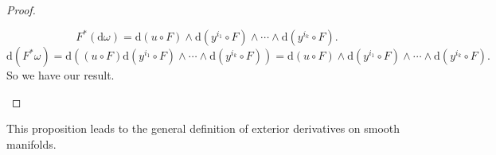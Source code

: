 \documentclass[../main.tex]{subfiles}
\begin{document}
\begin{proof}
\begin{itemize}
      \begin{equation*}
        F^*(\mathrm{d} \omega) = \mathrm{d} (u \circ F) \wedge \mathrm{d} (y^{i_1} \circ F) \wedge \cdots \wedge \mathrm{d} (y^{i_k} \circ F).
      \end{equation*}
      \begin{equation*}
        \mathrm{d} (F^* \omega) = \mathrm{d} ((u \circ F) \mathrm{d} (y^{i_1} \circ F) \wedge \cdots \wedge \mathrm{d} (y^{i_k} \circ F)) = \mathrm{d} (u \circ F) \wedge \mathrm{d} (y^{i_1} \circ F) \wedge \cdots \wedge \mathrm{d} (y^{i_k} \circ F).
      \end{equation*}
      So we have our result.
  \end{itemize}
\end{proof}

This proposition leads to the general definition of exterior derivatives on smooth manifolds.
\end{document}
